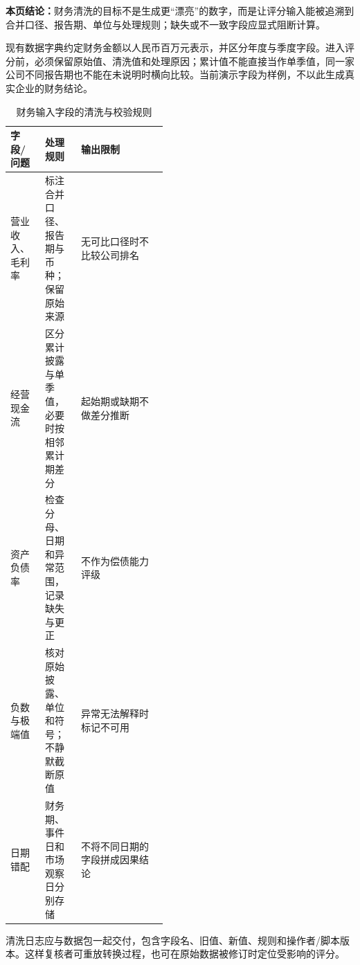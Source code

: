 
\textbf{本页结论：}财务清洗的目标不是生成更“漂亮”的数字，而是让评分输入能被追溯到合并口径、报告期、单位与处理规则；缺失或不一致字段应显式阻断计算。

现有数据字典约定财务金额以人民币百万元表示，并区分年度与季度字段\cite{wty-repo-dictionary}。进入评分前，必须保留原始值、清洗值和处理原因；累计值不能直接当作单季值，同一家公司不同报告期也不能在未说明时横向比较。当前演示字段为样例，不以此生成真实企业的财务结论。

\begin{table}[htbp]
\centering
\caption{财务输入字段的清洗与校验规则}
\label{tab:wty-financial-cleaning}
\small
\begin{tabularx}{\linewidth}{p{0.22\linewidth}p{0.23\linewidth}X}
\toprule
字段/问题 & 处理规则 & 输出限制 \\
\midrule
营业收入、毛利率 & 标注合并口径、报告期与币种；保留原始来源 & 无可比口径时不比较公司排名 \\
经营现金流 & 区分累计披露与单季值，必要时按相邻累计期差分 & 起始期或缺期不做差分推断 \\
资产负债率 & 检查分母、日期和异常范围，记录缺失与更正 & 不作为偿债能力评级 \\
负数与极端值 & 核对原始披露、单位和符号；不静默截断原值 & 异常无法解释时标记不可用 \\
日期错配 & 财务期、事件日和市场观察日分别存储 & 不将不同日期的字段拼成因果结论 \\
\bottomrule
\end{tabularx}
\end{table}

清洗日志应与数据包一起交付，包含字段名、旧值、新值、规则和操作者/脚本版本。这样复核者可重放转换过程，也可在原始数据被修订时定位受影响的评分。
